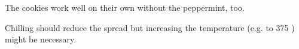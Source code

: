 \begin{variation}
\item The cookies work well on their own without the peppermint, too.
\end{variation}

\begin{experiments}
\item Chilling should reduce the spread but increasing the temperature (e.g. to 375 \Fahrenheit) might be necessary.
\end{experiments}

\recipeend
